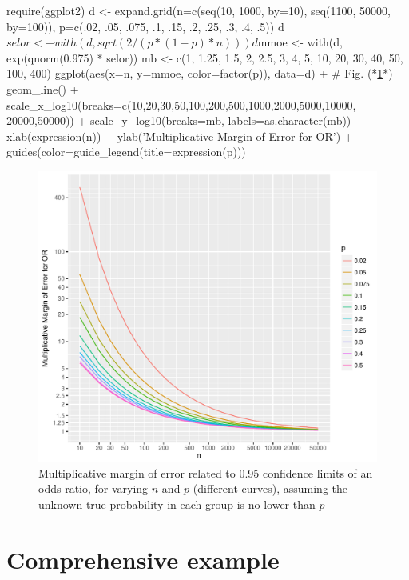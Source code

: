\begin{Schunk}
\begin{Sinput}
require(ggplot2)
d <- expand.grid(n=c(seq(10, 1000, by=10), seq(1100, 50000, by=100)),
                 p=c(.02, .05, .075, .1, .15, .2, .25, .3, .4, .5))
d$selor <- with(d, sqrt(2 / (p * (1 - p) * n)))
d$mmoe  <- with(d, exp(qnorm(0.975) * selor))
mb <- c(1, 1.25, 1.5, 2, 2.5, 3, 4, 5, 10, 20, 30, 40, 50, 100, 400)
ggplot(aes(x=n, y=mmoe, color=factor(p)), data=d) +   # Fig. (*\ref{fig:prop-mmeor}*)
  geom_line() +
  scale_x_log10(breaks=c(10,20,30,50,100,200,500,1000,2000,5000,10000,
                  20000,50000)) +
  scale_y_log10(breaks=mb, labels=as.character(mb)) +
  xlab(expression(n)) + ylab('Multiplicative Margin of Error for OR') +
  guides(color=guide_legend(title=expression(p)))
\end{Sinput}
\begin{figure}[htbp]

\centerline{\includegraphics[width=\maxwidth]{prop-mmeor-1} }

\caption[Multiplicative margin of error for odds ratios]{Multiplicative margin of error related to 0.95 confidence limits of an odds ratio, for varying $n$ and $p$ (different curves), assuming the unknown true probability in each group is no lower than $p$}\label{fig:prop-mmeor}
\end{figure}
\end{Schunk}


\section{Comprehensive example}

